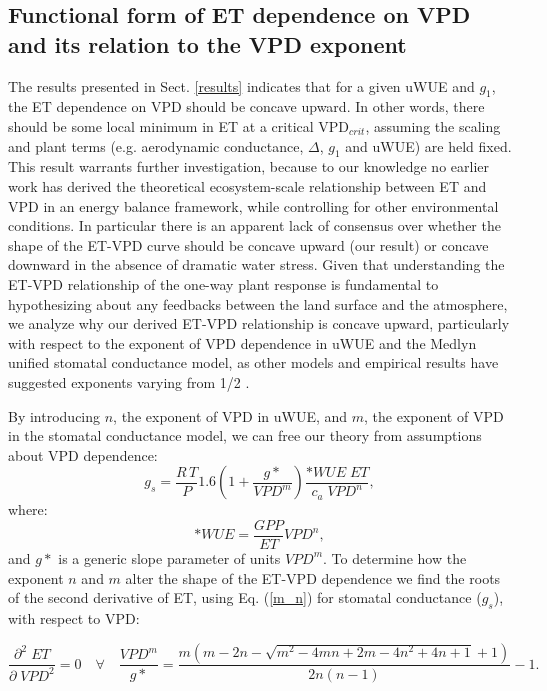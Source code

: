 \documentclass[12pt]{article}
\begin{document}
\subsection{Functional form of ET dependence on VPD and its relation
  to the VPD exponent}
\label{functional_form}

The results presented in Sect. \ref{results} indicates that for a
given uWUE and $g_1$, the ET dependence on VPD should be concave
upward. In other words, there should be some local minimum in ET at a
critical VPD$_{crit}$, assuming the scaling and plant terms
(e.g. aerodynamic conductance, $\Delta$, $g_1$ and uWUE) are held
fixed. This result warrants further investigation, because to our
knowledge no earlier work has derived the theoretical ecosystem-scale
relationship between ET and VPD in an energy balance framework, while
controlling for other environmental conditions. In particular there is
an apparent lack of consensus over whether the shape of the ET-VPD
curve should be concave upward (our result) or concave downward in the
absence of dramatic water stress. Given that understanding the ET-VPD
relationship of the one-way plant response is fundamental to
hypothesizing about any feedbacks between the land surface and the
atmosphere, we analyze why our derived ET-VPD relationship is concave
upward, particularly with respect to the exponent of VPD dependence in
uWUE and the Medlyn unified stomatal conductance model, as other
models and empirical results have suggested exponents varying from 1/2
\cite{Leuning_1990, Zhou_2015, Lin_2018}.

By introducing $n$, the exponent of VPD in uWUE, and $m$, the exponent
of VPD in the stomatal conductance model, we can free our theory from
assumptions about VPD dependence:
  \begin{equation}
    g_s = \frac{R \, T}{P} 1.6 \left(1 + \frac{g*}{VPD^m}\right) \frac{*WUE \; ET}{c_a \; VPD^n},
    \label{m_n}
  \end{equation}
where:
\[*WUE = \frac{GPP}{ET}VPD^n,\] and $g*$ is a generic slope parameter
of units $VPD^m$. To determine how the exponent $n$ and $m$ alter the
shape of the ET-VPD dependence we find the roots of the second
derivative of ET, using Eq. (\ref{m_n}) for stomatal conductance
($g_s$), with respect to VPD:

\begin{equation}
\frac{\partial^2 \; ET}{\partial \; VPD^2} = 0 \quad \forall \quad\frac{VPD^m}{g*} = \frac{m \left(m - 2 n - \sqrt{m^{2} - 4 m n + 2 m - 4 n^{2} + 4 n + 1} + 1\right)}{2 n \left(n - 1\right)} - 1.
\label{curves}
\end{equation}
\end{document}

